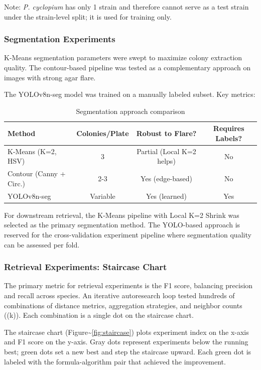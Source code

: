 Note: \textit{P. cyclopium} has only 1 strain and therefore cannot serve as a test strain under the strain-level split; it is used for training only.

\subsubsection{Segmentation Experiments}\label{segmentation-experiments}

K-Means segmentation parameters were swept to maximize colony extraction quality. The contour-based pipeline was tested as a complementary approach on images with strong agar flare.

The YOLOv8n-seg model was trained on a manually labeled subset. Key metrics:

\begin{table}[h]
\centering
\caption{Segmentation approach comparison}
\begin{tabular}{@{}lccc@{}}
\toprule
\textbf{Method} & \textbf{Colonies/Plate} & \textbf{Robust to Flare?} & \textbf{Requires Labels?} \\
\midrule
K-Means (K=2, HSV) & 3 & Partial (Local K=2 helps) & No \\
Contour (Canny + Circ.) & 2-3 & Yes (edge-based) & No \\
YOLOv8n-seg & Variable & Yes (learned) & Yes \\
\bottomrule
\end{tabular}
\end{table}

For downstream retrieval, the K-Means pipeline with Local K=2 Shrink was selected as the primary segmentation method. The YOLO-based approach is reserved for the cross-validation experiment pipeline where segmentation quality can be assessed per fold.

\subsubsection{Retrieval Experiments: Staircase Chart}\label{retrieval-experiments-staircase-chart}

The primary metric for retrieval experiments is the F1 score, balancing precision and recall across species. An iterative autoresearch loop tested hundreds of combinations of distance metrics, aggregation strategies, and neighbor counts ((k)). Each combination is a single dot on the staircase chart.

The staircase chart (Figure\textasciitilde{}\ref{fig:staircase}) plots experiment index on the x-axis and F1 score on the y-axis. Gray dots represent experiments below the running best; green dots set a new best and step the staircase upward. Each green dot is labeled with the formula-algorithm pair that achieved the improvement.

